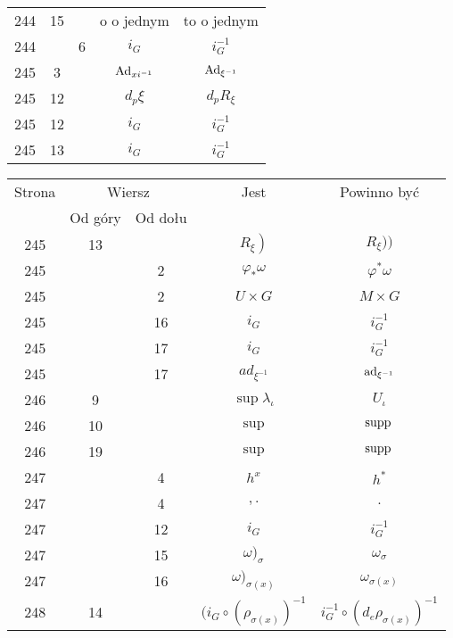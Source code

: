 \documentclass[a4paper,11pt]{article}
\begin{document}
\begin{center}
\begin{tabular}{|c|c|c|c|c|}
    244 & 15 & & o o jednym & to o jednym \\
    244 & & \hphantom{0}6 & $i_{ G }$ & $i^{ -1 }_{ G }$ \\
    245 & \hphantom{0}3 & & $\mathrm{Ad}_{ xi^{ -1 } }$ & $\mathrm{Ad}_{ \xi^{ -1 } }$ \\
    245 & 12 & & $d_{ p } \xi$ & $d_{ p } R_{ \xi }$ \\
    245 & 12 & & $i_{ G }$ & $i_{ G }^{ -1 }$ \\
    245 & 13 & & $i_{ G }$ & $i_{ G }^{ -1 }$ \\
    \hline
  \end{tabular}





  \newpage

  \begin{tabular}{|c|c|c|c|c|}
    \hline
    Strona & \multicolumn{2}{c|}{Wiersz} & Jest
                              & Powinno być \\ \cline{2-3}
    & Od góry & Od dołu & & \\
    \hline
    245 & 13 & & $\left. R_{ \xi } \right)$ & $ R_{ \xi } ) \big)$ \\
    245 & & \hphantom{0}2 & $\varphi_{ * } \omega$ & $\varphi^{ * } \omega$ \\
    245 & & \hphantom{0}2 & $U \times G$ & $M \times G$ \\
    245 & & 16 & $i_{ G }$ & $i_{ G }^{ -1 }$ \\
    245 & & 17 & $i_{ G }$ & $i_{ G }^{ -1 }$ \\
    245 & & 17 & $ad_{ \xi^{ -1 } }$ & $\mathrm{ad}_{ \xi^{ -1 } }$ \\
    246 & \hphantom{0}9 & & $\sup \lambda_{ \iota }$ & $U_{ \iota }$ \\
    246 & 10 & & $\sup$ & $\mathrm{supp}\,$ \\
    246 & 19 & & $\sup$ & $\mathrm{supp}\,$ \\
    247 & & \hphantom{0}4 & $h^{ x }$ & $h^{ * }$ \\
    247 & & \hphantom{0}4 & $, .$ & $.$ \\
    247 & & 12 & $i_{ G }$ & $i_{ G }^{ -1 }$ \\
    247 & & 15 & $\omega )_{ \sigma }$ & $\omega_{ \sigma }$ \\
    247 & & 16 & $\omega )_{ \sigma( x ) }$ & $\omega_{ \sigma( x ) }$ \\
    248 & 14 & & $( i_{ G } \circ ( \rho_{ \sigma( x ) } )^{ -1 }$
           & $i_{ G }^{ -1 } \circ ( d_{ e }\rho_{ \sigma( x ) } )^{ -1 }$ \\

\end{tabular}
\end{center}
\end{document}

